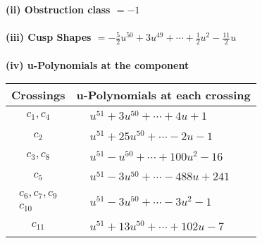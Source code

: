 \documentclass[1p]{elsarticle_modified}
\theoremstyle{definition}
\begin{document}
\flushleft \textbf{(ii) Obstruction class $= -1$}\\~\\
\flushleft \textbf{(iii) Cusp Shapes $= -\frac{5}{2} u^{50}+3 u^{49}+\cdots+\frac{1}{2} u^2-\frac{11}{2} u$}\\~\\
\newpage\renewcommand{\arraystretch}{1}
\flushleft \textbf{(iv) u-Polynomials at the component}\newline \\
\begin{tabular}{m{50pt}|m{274pt}}
Crossings & \hspace{64pt}u-Polynomials at each crossing \\
\hline $$\begin{aligned}c_{1},c_{4}\end{aligned}$$&$\begin{aligned}
&u^{51}+3 u^{50}+\cdots+4 u+1
\end{aligned}$\\
\hline $$\begin{aligned}c_{2}\end{aligned}$$&$\begin{aligned}
&u^{51}+25 u^{50}+\cdots-2 u-1
\end{aligned}$\\
\hline $$\begin{aligned}c_{3},c_{8}\end{aligned}$$&$\begin{aligned}
&u^{51}- u^{50}+\cdots+100 u^2-16
\end{aligned}$\\
\hline $$\begin{aligned}c_{5}\end{aligned}$$&$\begin{aligned}
&u^{51}-3 u^{50}+\cdots-488 u+241
\end{aligned}$\\
\hline $$\begin{aligned}c_{6},c_{7},c_{9}\\c_{10}\end{aligned}$$&$\begin{aligned}
&u^{51}-3 u^{50}+\cdots-3 u^2-1
\end{aligned}$\\
\hline $$\begin{aligned}c_{11}\end{aligned}$$&$\begin{aligned}
&u^{51}+13 u^{50}+\cdots+102 u-7
\end{aligned}$\\
\hline
\end{tabular}\\~\\
\end{document}
